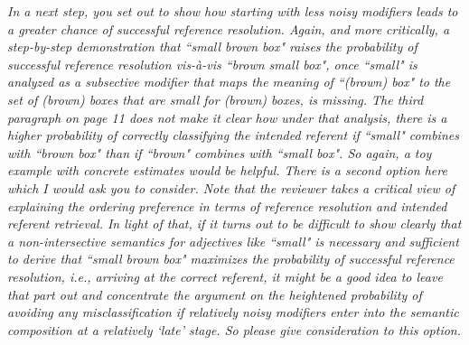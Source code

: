 \documentclass[12pt]{article}
\begin{document}
\item \emph{In a next step, you set out to show how starting with less noisy modifiers
	leads to a greater chance of successful reference resolution. Again, and
	more critically, a step-by-step demonstration that ``small brown box" raises
	the probability of successful reference resolution vis-\`{a}-vis ``brown small
	box", once ``small" is analyzed as a subsective modifier that maps the
	meaning of ``(brown) box" to the set of (brown) boxes that are small for
	(brown) boxes, is missing. The third paragraph on page 11 does not make it
	clear how under that analysis, there is a higher probability of correctly
	classifying the intended referent if ``small" combines with ``brown box" than
	if ``brown" combines with ``small box". So again, a toy example with concrete
	estimates would be helpful. There is a second option here which I would ask you to consider. Note that
	the reviewer takes a critical view of explaining the ordering preference in
	terms of reference resolution and intended referent retrieval. In light of
	that, if it turns out to be difficult to show clearly that a
	non-intersective semantics for adjectives like ``small" is necessary and
	sufficient to derive that ``small brown box" maximizes the probability of
	successful reference resolution, i.e., arriving at the correct referent, it
	might be a good idea to leave that part out and concentrate the argument on
	the heightened probability of avoiding any misclassification if relatively
	noisy modifiers enter into the semantic composition at a relatively `late'
	stage. So please give consideration to this option.}
\end{document}
